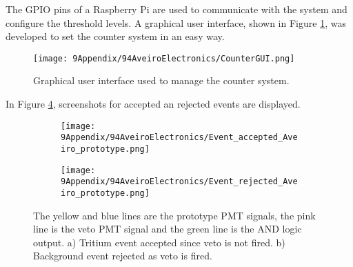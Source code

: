 \begin{enumerate}
The GPIO pins of a Raspberry Pi are used to communicate with the system and configure the threshold levels. A graphical user interface, shown in Figure \ref{fig:GUIcounts}, was developed to set the counter system in an easy way.
\begin{figure}[h]
\centering
\texttt{[image: 9Appendix/94AveiroElectronics/CounterGUI.png]}
\caption{Graphical user interface used to manage the counter system. \label{fig:GUIcounts}}
\end{figure}
In Figure \ref{fig:ScreenshotElectronic}, screenshots for accepted an rejected events are displayed.
\begin{figure}
\centering
    \begin{subfigure}[b]{0.75\textwidth}
    \centering
    \texttt{[image: 9Appendix/94AveiroElectronics/Event\_accepted\_Aveiro\_prototype.png]}  
    \caption{\label{subfig:TrueTritiumEvent}}
    \end{subfigure}
    \hfill
    \begin{subfigure}[b]{0.75\textwidth}
    \centering
    \texttt{[image: 9Appendix/94AveiroElectronics/Event\_rejected\_Aveiro\_prototype.png]}  
    \caption{\label{subfig:FalseTritiumEvent}}
    \end{subfigure}
 \caption{The yellow and blue lines are the prototype PMT signals, the pink line is the veto PMT signal and the green line is the AND logic output. a) Tritium event accepted since veto is not fired. b) Background event rejected as veto is fired.}
 \label{fig:ScreenshotElectronic}
\end{figure}

\end{enumerate}